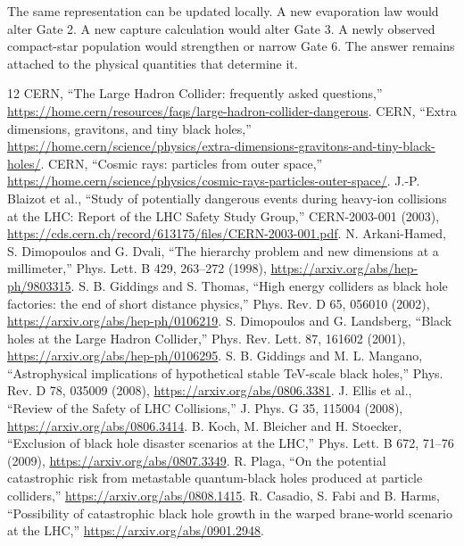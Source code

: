 \documentclass[11pt]{article}
\begin{document}
The same representation can be updated locally. A new evaporation law would alter Gate 2. A new capture calculation would alter Gate 3. A newly observed compact-star population would strengthen or narrow Gate 6. The answer remains attached to the physical quantities that determine it.

\begin{thebibliography}{12}
 CERN, ``The Large Hadron Collider: frequently asked questions,'' \url{https://home.cern/resources/faqs/large-hadron-collider-dangerous}.
 CERN, ``Extra dimensions, gravitons, and tiny black holes,'' \url{https://home.cern/science/physics/extra-dimensions-gravitons-and-tiny-black-holes/}.
 CERN, ``Cosmic rays: particles from outer space,'' \url{https://home.cern/science/physics/cosmic-rays-particles-outer-space/}.
 J.-P. Blaizot et al., ``Study of potentially dangerous events during heavy-ion collisions at the LHC: Report of the LHC Safety Study Group,'' CERN-2003-001 (2003), \url{https://cds.cern.ch/record/613175/files/CERN-2003-001.pdf}.
 N. Arkani-Hamed, S. Dimopoulos and G. Dvali, ``The hierarchy problem and new dimensions at a millimeter,'' Phys. Lett. B 429, 263--272 (1998), \url{https://arxiv.org/abs/hep-ph/9803315}.
 S. B. Giddings and S. Thomas, ``High energy colliders as black hole factories: the end of short distance physics,'' Phys. Rev. D 65, 056010 (2002), \url{https://arxiv.org/abs/hep-ph/0106219}.
 S. Dimopoulos and G. Landsberg, ``Black holes at the Large Hadron Collider,'' Phys. Rev. Lett. 87, 161602 (2001), \url{https://arxiv.org/abs/hep-ph/0106295}.
 S. B. Giddings and M. L. Mangano, ``Astrophysical implications of hypothetical stable TeV-scale black holes,'' Phys. Rev. D 78, 035009 (2008), \url{https://arxiv.org/abs/0806.3381}.
 J. Ellis et al., ``Review of the Safety of LHC Collisions,'' J. Phys. G 35, 115004 (2008), \url{https://arxiv.org/abs/0806.3414}.
 B. Koch, M. Bleicher and H. Stoecker, ``Exclusion of black hole disaster scenarios at the LHC,'' Phys. Lett. B 672, 71--76 (2009), \url{https://arxiv.org/abs/0807.3349}.
 R. Plaga, ``On the potential catastrophic risk from metastable quantum-black holes produced at particle colliders,'' \url{https://arxiv.org/abs/0808.1415}.
 R. Casadio, S. Fabi and B. Harms, ``Possibility of catastrophic black hole growth in the warped brane-world scenario at the LHC,'' \url{https://arxiv.org/abs/0901.2948}.
\end{thebibliography}
\end{document}
